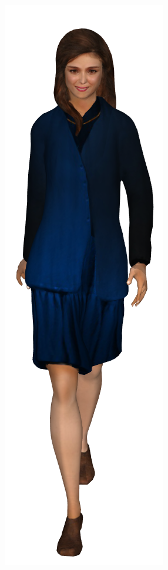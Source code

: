 \begin{figure}[h]
  \centering
  \begin{subfigure}[b]{.22\textwidth}
    \includegraphics[width=\textwidth]{figures/woman/equal_distance/0.png}

\end{subfigure}
\end{figure}
